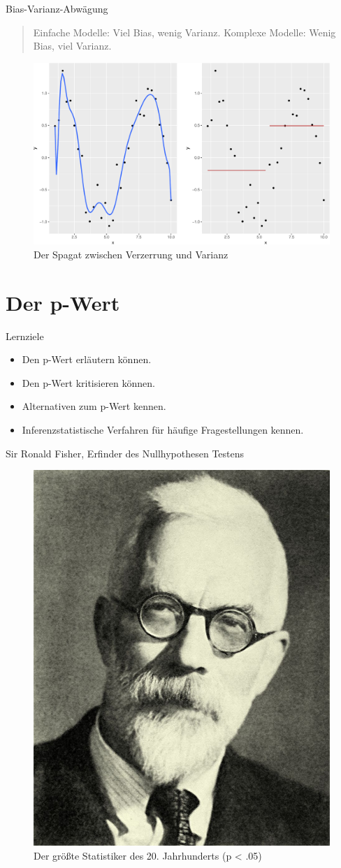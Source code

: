 \begin{frame}{Bias-Varianz-Abwägung}

\begin{quote}
Einfache Modelle: Viel Bias, wenig Varianz. Komplexe Modelle: Wenig
Bias, viel Varianz.
\end{quote}

\begin{figure}

{\centering \includegraphics[width=0.5\linewidth]{PraDa_Folien_nm_2_files/figure-beamer/plot-bias-variance-1} 

}

\caption{Der Spagat zwischen Verzerrung und Varianz}\label{fig:plot-bias-variance}
\end{figure}

\end{frame}

\section{Der p-Wert}\label{p-wert}

\begin{frame}{Lernziele}

\begin{itemize}
\tightlist
\item
  Den p-Wert erläutern können.
\item
  Den p-Wert kritisieren können.
\item
  Alternativen zum p-Wert kennen.
\item
  Inferenzstatistische Verfahren für häufige Fragestellungen kennen.
\end{itemize}

\end{frame}

\begin{frame}{Sir Ronald Fisher, Erfinder des Nullhypothesen Testens}

\begin{figure}

{\centering \includegraphics[width=0.2\linewidth]{../images/inferenz/Ronald_Fisher} 

}

\caption{Der größte Statistiker des 20. Jahrhunderts (p < .05)}\label{fig:sir-fisher}
\end{figure}

\end{frame}

